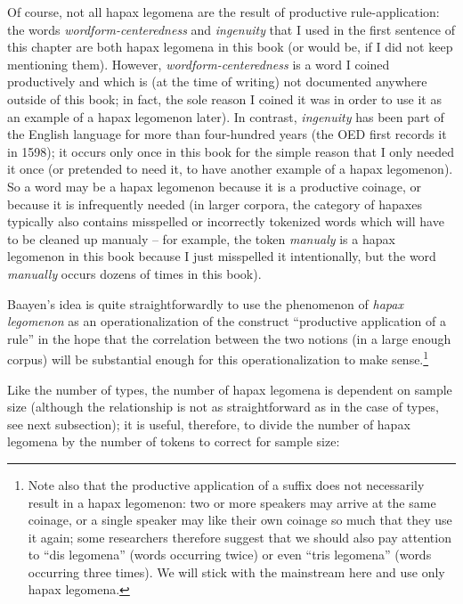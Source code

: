Of course, not all hapax  legomena are the result of productive rule\hyp{}application: the words \textit{wordform\hyp{}centeredness} and \textit{ingenuity} that I used in the first sentence of this chapter are both hapax legomena in this book (or would be, if I did not keep mentioning them). However, \textit{wordform\hyp{}centeredness} is a word I coined productively  and which is (at the time of writing) not documented anywhere outside of this book; in fact, the sole reason I coined it was in order to use it as an example of a hapax  legomenon later). In contrast, \textit{ingenuity} has been part of the English language for more than four\hyp{}hundred years (the OED  first records it in 1598); it occurs only once in this book for the simple reason that I only needed it once (or pretended to need it, to have another example of a hapax legomenon). So a word may be a hapax  legomenon because it is a productive  coinage, or because it is infrequently needed (in larger  corpora, the category of hapaxes typically also contains misspelled or incorrectly tokenized  words which will have to be cleaned up manualy  -- for example, the token \textit{manualy} is a hapax legomenon in this book because I just misspelled it intentionally, but the word \textit{manually} occurs dozens of times in this book).

Baayen's idea is quite straightforwardly to use the phenomenon of \textit{hapax  legomenon} as an operationalization  of the construct ``productive  application of a rule'' in the hope that the correlation between the two notions (in a large  enough corpus) will be substantial enough for this operationalization to make sense.\footnote{Note also that the productive application of a suffix  does not necessarily result in a hapax  legomenon: two or more speakers may arrive at the same coinage, or a single speaker may like their own coinage so much that they use it again; some researchers therefore suggest that we should also pay attention to ``dis legomena'' (words occurring twice) or even ``tris legomena'' (words occurring three times). We will stick with the mainstream here and use only hapax legomena.}

Like the number of types,  the number of hapax  legomena is dependent on sample size  (although the relationship is not as straightforward as in the case of types, see next subsection); it is useful, therefore, to divide the number of hapax legomena by the number of tokens  to correct for sample size:

